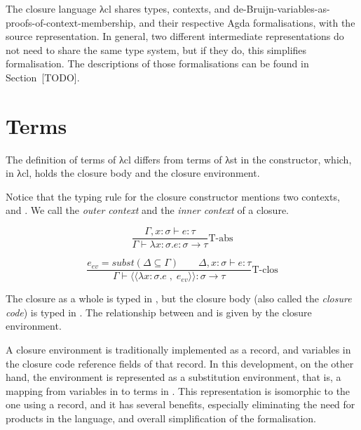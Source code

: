 \documentclass[bsc,frontabs,oneside,singlespacing,parskip,deptreport]{infthesis}
\theoremstyle{definition}
\theoremstyle{lemma}
\begin{document}
The closure language λcl shares types, contexts, and
de-Bruijn-variables-as-proofs-of-context-membership, and their
respective Agda formalisations, with the source representation. In
general, two different intermediate representations do not need to
share the same type system, but if they do, this simplifies
formalisation. The descriptions of those formalisations can be found
in Section~[TODO].

\section{Terms}
\label{sec:closure-language-cl-1}

The definition of terms of λcl differs from terms of λst in the 
constructor, which, in λcl, holds the closure body and the closure
environment.


Notice that the typing rule for the closure constructor 
mentions two contexts,  and . We call  the
\textit{outer context} and  the \textit{inner context} of a
closure.

\begin{minipage}{.5\textwidth}
  \[
  \frac
  {\Gamma , x : \sigma \vdash e : \tau}
  {\Gamma \vdash \lambda x : \sigma . e : \sigma \rightarrow \tau}
  \text{T-abs}
  \]
\end{minipage}%
\begin{minipage}{.5\textwidth}
  \[
  \frac
  {e_{ev} = subst ( \Delta \subseteq \Gamma ) \quad \quad \Delta , x : \sigma \vdash e : \tau}
  {\Gamma \vdash \langle\langle \lambda x : \sigma . e \; , \; e_{ev} \rangle\rangle : \sigma \rightarrow \tau}
  \text{T-clos}
  \]
\end{minipage}

The closure as a whole is typed in , but the closure body (also
called the \textit{closure code}) is typed in . The
relationship between  and  is given by the closure
environment.

A closure environment is traditionally implemented as a record, and
variables in the closure code reference fields of that record. In this
development, on the other hand, the environment is represented as a
substitution environment, that is, a mapping from variables in 
to terms in . This representation is isomorphic to the one using
a record, and it has several benefits, especially eliminating the need
for products in the language, and overall simplification of the
formalisation.
\end{document}
